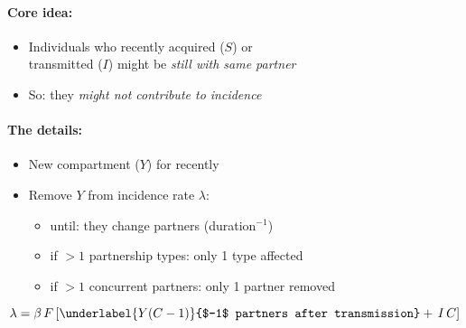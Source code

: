 \begin{minipage}{.38\linewidth}
  \centering
  
\end{minipage}
\begin{minipage}{.62\linewidth}
  \paragraph{Core idea:}\unskip
  \begin{itemize}
    \item Individuals who \textcolor{Y}{recently acquired ($S$) or\\transmitted ($I$)}
          might be \emph{still with same partner}
    \item So: they \emph{might not contribute to incidence}
  \end{itemize}
  \baselineskip
\end{minipage}\bigskip\par
\begin{minipage}{.67\linewidth}
  \paragraph{The details:}\unskip
  \begin{itemize}
    \item New compartment (\textcolor{Y}{$Y$}) for recently 
    \item Remove $Y$ from incidence rate $\lambda$:
    \begin{itemize}
      \item until: they change partners (duration${}^{-1}$)
      \item if $>1$ partnership types: only 1 type affected
      \item if $>1$ concurrent   partners: only 1 partner removed
    \end{itemize}
  \end{itemize}
\end{minipage}%
\begin{minipage}{.33\linewidth}
  \baselineskip
  \begin{equation*}
    \lambda = \beta\,F\,[\underlabel{Y(C-1)}{$-1$ partners after transmission}+\,I\,C]
  \end{equation*}
\end{minipage}

